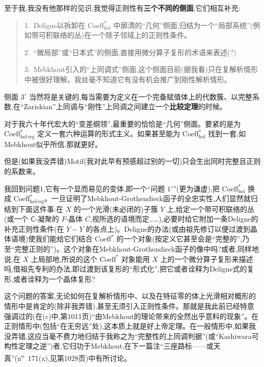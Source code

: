 \noindent 至于我,我没有他那样的见识,我觉得正则性有\textbf{三个不同的侧面},它们相互补充:
\begin{quote}
1.~Deligne以拆卸在 $\mathrm{Coeff}^{*}_{\mathrm{hol}}$ 中廓清的“几何”侧面,归结为一个“局部系统”(例如带可积联络的丛)在一个除子邻域上的正则性条件。

2.~“微局部”或“日本式”的侧面,直接用微分算子复形的术语来表述(?)

3.~Mebkhout引入的“上同调式”侧面,这个侧面目前(据我看)只在复解析情形中被很好理解。我丝毫不知道它有没有机会推广到刚性解析情形。
\end{quote}
侧面 $3^{\circ}$ 当然将是关键的,每当需要为定义在一个完备赋值体上的代数簇、以完整系数,在“Zariskian”上同调与“刚性”上同调之间建立一个\textbf{比较定理}的时候。

\noindent 对于我六十年代宏大的“变差纲领”,最重要的恰恰是“几何”侧面。要紧的是为 $\mathrm{Coeff}^{*}_{\mathrm{hol\,reg}}$ 定义一套六种运算的形式主义。如果甚至能为 $\mathrm{Coeff}^{*}_{\mathrm{hol}}$ 找到一套,如Mebkhout似乎所信,那就更好。

\noindent 但是(如果我没弄错)Motif(我对此早有预感\dmark{}超过别的一切)只会生出同时完整且正则的系数来。

\noindent 我回到问题1,它有一个显而易见的变体,即一个“问题 $1'$”(更为谦虚),把 $\mathrm{Coeff}^{*}_{\mathrm{hol}}$ 换成 $\mathrm{Coeff}^{*}_{\mathrm{hol\,reg}}$。一旦证明了Mebkhout-Grothendieck函子的全忠实性,人们显然就归结到下面这件事:在 $X$ 的一个光滑(未必闭的)子簇 $Y$ 上,给定一个带可积联络的丛(或一个 $\mathsf{C}$-凝聚的 $F$-晶体 $C$,视所选的语境而定……),必要时给它附加一条Deligne的补充正则性条件(在 $\overline{Y}-Y$ 的各点上)。Deligne的办法(或由祖先修订以便过渡到晶体语境)使我们能给它们结合 $\mathrm{Coeff}^{*}$ 的一个对象(按定义它甚至会是“完整的”,乃至“完整正则的”)。这个对象在Mebkhout-Grothendieck函子的像中吗?或者,同样地说,在 $X$ 上局部地,所说的这个 $\mathrm{Coeff}^{*}$ 对象能用 $X$ 上的一个微分算子复形来描述吗,借祖先专利的办法,即过渡到该复形的“形式化”,把它或者诠释为Deligne式的复形,或者诠释为一个晶体复形?

\noindent 这个问题的答案,无论如何在复解析情形中、以及在特征零的体上光滑相对概形的情形中是肯定的(除非我弄错),甚至无须引入正则性条件。那就是我此前已经特意强调过的(在(c)中,第1011页)“由Mebkhout的理论带来的全然出乎意料的现象”。在正则情形中(包括“在无穷远”处),这本质上就是好上帝定理。在一般情形中,如果我没弄错,这应当毫不费力地归结于我称之为“完整性的上同调判据”(或“Kashiwara可构性定理之逆”)者,它归功于Mebkhout,在下一篇注“三座路标——或天真”(n\textsuperscript{o}~171(x),见第1028页)中有所讨论。

